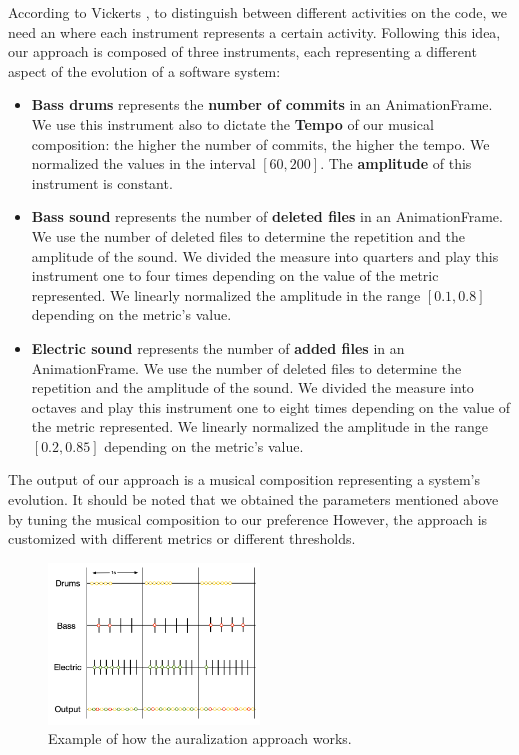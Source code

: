 According to Vickerts \cite{Vickers2004}, to distinguish between different activities on the code, we need an \emph{} where each instrument represents a certain activity. Following this idea, our approach is composed of three instruments, each representing a different aspect of the evolution of a software system:

\begin{itemize}

    \item \textbf{Bass drums} represents the \textbf{number of commits} in an AnimationFrame. We use this instrument also to dictate the \textbf{Tempo} of our musical composition: the higher the number of commits, the higher the tempo. We normalized the values in the interval $\left[60,200\right]$. The \textbf{amplitude} of this instrument is constant.
    
    \item \textbf{Bass sound} represents the number of \textbf{deleted files} in an AnimationFrame. We use the number of deleted files to determine the repetition and the amplitude of the sound. We divided the measure into quarters and play this instrument one to four times depending on the value of the metric represented. We linearly normalized the amplitude in the range $\left[0.1,0.8\right]$ depending on the metric's value.
    
    \item \textbf{Electric sound} represents the number of \textbf{added files} in an AnimationFrame. We use the number of deleted files to determine the repetition and the amplitude of the sound. We divided the measure into octaves and play this instrument one to eight times depending on the value of the metric represented. We linearly normalized the amplitude in the range $\left[0.2,0.85\right]$ depending on the metric's value.

\end{itemize}

The output of our approach is a musical composition representing a system's evolution. It should be noted that we obtained the parameters mentioned above by tuning the musical composition to our preference However, the approach is customized with different metrics or different thresholds. 


\begin{figure}
    \center
    \includegraphics[width=0.5\textwidth]{AuralizationApproach.jpg}
    \caption{Example of how the auralization approach works. }
    \label{fig:ApproachArualization}
\end{figure}

